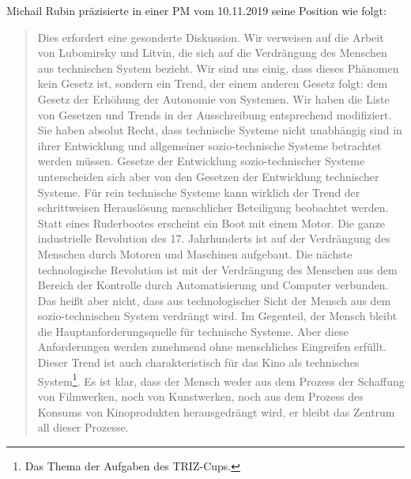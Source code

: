 \documentclass[11pt,a4paper]{article}
\begin{document}
Michail Rubin präzisierte in einer PM vom 10.11.2019 seine Position wie folgt:
\begin{quote}
  Dies erfordert eine gesonderte Diskussion. Wir verweisen auf die Arbeit von
  Lubomirsky und Litvin, die sich auf die Verdrängung des Menschen aus
  technischen System bezieht.  Wir sind uns einig, dass dieses Phänomen kein
  Gesetz ist, sondern ein Trend, der einem anderen Gesetz folgt: dem Gesetz
  der Erhöhung der Autonomie von Systemen.  Wir haben die Liste von Gesetzen
  und Trends in der Ausschreibung entsprechend modifiziert. Sie haben absolut
  Recht, dass technische Systeme nicht unabhängig sind in ihrer Entwicklung
  und allgemeiner sozio-technische Systeme betrachtet werden müssen. Gesetze
  der Entwicklung sozio-technischer Systeme unterscheiden sich aber von den
  Gesetzen der Entwicklung technischer Systeme. Für rein technische Systeme
  kann wirklich der Trend der schrittweisen Herauslösung menschlicher
  Beteiligung beobachtet werden. Statt eines Ruderbootes erscheint ein Boot
  mit einem Motor. Die ganze industrielle Revolution des 17. Jahrhunderts ist
  auf der Verdrängung des Menschen durch Motoren und Maschinen aufgebaut. Die
  nächste technologische Revolution ist mit der Verdrängung des Menschen aus
  dem Bereich der Kontrolle durch Automatisierung und Computer verbunden. Das
  heißt aber nicht, dass aus technologischer Sicht der Mensch aus dem
  sozio-technischen System verdrängt wird. Im Gegenteil, der Mensch bleibt die
  Hauptanforderungsquelle für technische Systeme. Aber diese Anforderungen
  werden zunehmend ohne menschliches Eingreifen erfüllt. Dieser Trend ist auch
  charakteristisch für das Kino als technisches System\footnote{Das Thema der
    Aufgaben des TRIZ-Cups.}. Es ist klar, dass der Mensch weder aus dem
  Prozess der Schaffung von Filmwerken, noch von Kunstwerken, noch aus dem
  Prozess des Konsums von Kinoprodukten herausgedrängt wird, er bleibt das
  Zentrum all dieser Prozesse.
\end{quote}
\end{document}
